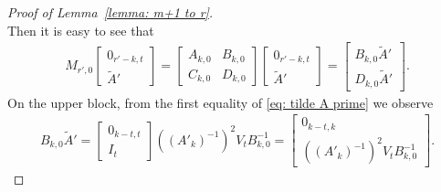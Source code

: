 \documentclass[11pt]{amsart}
\theoremstyle{definition}
\numberwithin{equation}{subsection}
\theoremstyle{plain}
\theoremstyle{plain}
\theoremstyle{plain}
\theoremstyle{plain}
\theoremstyle{plain}
\theoremstyle{plain}
\theoremstyle{plain}
\theoremstyle{plain}
\theoremstyle{plain}
\theoremstyle{plain}
\theoremstyle{plain}
\theoremstyle{plain}
\theoremstyle{definition}
\theoremstyle{definition}
\theoremstyle{definition}
\theoremstyle{remark}
\renewcommand{\(}{\textup{(}}
\renewcommand{\)}{\textup{)}}
\begin{document}
\begin{proof}[Proof of Lemma~\ref{lemma: m+1 to r}]
\begin{equation}
    \end{equation}
Then it is easy to see that
    \begin{align*}
        M_{r',0}
        \begin{bmatrix}
            0_{r'-k,t} \\
            \tilde A'
        \end{bmatrix}
        =
        \begin{bmatrix}
            A_{k,0} & B_{k,0} \\
            C_{k,0} & D_{k,0}
        \end{bmatrix}
        \begin{bmatrix}
            0_{r'-k,t} \\
            \tilde A'
        \end{bmatrix}
        =
        \begin{bmatrix}
          B_{k,0}\tilde A' \\
          D_{k,0}\tilde A'
        \end{bmatrix}.
    \end{align*}
On the upper block, from the first equality of \eqref{eq: tilde A prime} we observe
    \begin{align*}
        B_{k,0}\tilde{A}'
        =
        \begin{bmatrix}
            0_{k-t,t} \\
            I_t
        \end{bmatrix}
        ((A'_k)^{-1})^2V_tB_{k,0}^{-1}
        =
        \begin{bmatrix}
            0_{k-t,k} \\
            ((A'_k)^{-1})^2V_tB_{k,0}^{-1}
        \end{bmatrix}.
    \end{align*}





\end{proof}
\end{document}
